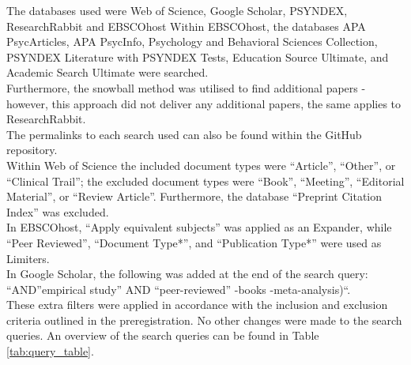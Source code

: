 \documentclass[
  stu]{apa7}
\begin{document}
The databases used were Web of Science, Google Scholar, PSYNDEX, ResearchRabbit and EBSCOhost Within EBSCOhost, the databases APA PsycArticles, APA PsycInfo, Psychology and Behavioral Sciences Collection, PSYNDEX Literature with PSYNDEX Tests, Education Source Ultimate, and Academic Search Ultimate were searched.\\
Furthermore, the snowball method was utilised to find additional papers - however, this approach did not deliver any additional papers, the same applies to ResearchRabbit.\\
The permalinks to each search used can also be found within the GitHub repository.\\
Within Web of Science the included document types were ``Article'', ``Other'', or ``Clinical Trail''; the excluded document types were ``Book'', ``Meeting'', ``Editorial Material'', or ``Review Article''.
Furthermore, the database ``Preprint Citation Index'' was excluded.\\
In EBSCOhost, ``Apply equivalent subjects'' was applied as an Expander, while ``Peer Reviewed'', ``Document Type*'', and ``Publication Type*'' were used as Limiters.\\
In Google Scholar, the following was added at the end of the search query: ``AND''empirical study'' AND ``peer-reviewed'' -books -meta-analysis)``.\\
These extra filters were applied in accordance with the inclusion and exclusion criteria outlined in the preregistration. No other changes were made to the search queries. An overview of the search queries can be found in Table \ref{tab:query_table}.
\end{document}
